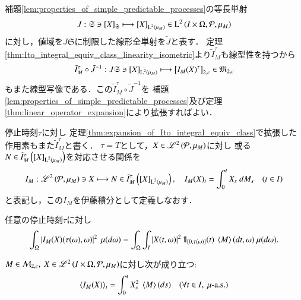 	\begin{prf}
		補題\ref{lem:properties_of_simple_predictable_processes}の等長単射
		\begin{align}
			J:\mathfrak{S} \ni \left[X\right]_{\mathfrak{S}} \longmapsto \left[X\right]_{\operatorname{L}^{2} \left(\mu_M\right)} \in \operatorname{L}^{2} \left(I \times \Omega,\mathcal{P},\mu_M\right)
		\end{align}
		に対し，値域を$J\mathfrak{S}$に制限した線形全単射を$\tilde{J}$と表す．
		定理\ref{thm:Ito_integral_equiv_class_linearity_isometric}より$\tilde{I}^\tau_M$も線型性を持つから
		\begin{align}
			\tilde{I}^\tau_M \circ \tilde{J}^{-1}: J \mathfrak{S} \ni \left[X\right]_{\operatorname{L}^{2} \left(\mu_M\right)} \longmapsto \left[I_M(X)^\tau\right]_{2,c} \in \mathfrak{M}_{2,c}
		\end{align}
		もまた線型写像である．この$\tilde{I}^\tau_M \circ \tilde{J}^{-1}$を
		補題\ref{lem:properties_of_simple_predictable_processes}及び定理\ref{thm:linear_operator_expansion}により拡張すればよい．
		\QED
	\end{prf}
	
	\begin{screen}
		\begin{dfn}[伊藤積分の拡張]
			停止時刻$\tau$に対し
			定理\ref{thm:expansion_of_Ito_integral_equiv_class}で拡張した作用素もまた$\tilde{I}^\tau_M$と書く．
			$\tau = T$として，$X \in \mathscr{L}^{2} \left(\mathcal{P},\mu_M\right)$に対し
			或る$N \in \tilde{I}^\tau_M\left( \left[X\right]_{\operatorname{L}^{2} \left(\mu_M\right)} \right)$を対応させる関係を
			\begin{align}
				I_M: \mathscr{L}^{2} \left(\mathcal{P},\mu_M\right) \ni X \longmapsto N \in \tilde{I}^\tau_M\left( \left[X\right]_{\operatorname{L}^{2} \left(\mu_M\right)} \right), \quad
				I_M(X)_t = \int_0^t X_s\ d M_s \quad (t \in I)
			\end{align}
			と表記し，この$I_M$を伊藤積分として定義しなおす．
		\end{dfn}
	\end{screen}
	
	\begin{screen}
		\begin{lem}[停止時刻で停めた伊藤積分]
			任意の停止時刻$\tau$に対し
			\begin{align}
				\int_\Omega \left| I_M(X)(\tau(\omega),\omega) \right|^2\ \mu(d\omega)
				= \int_\Omega \int_I \left| X(t,\omega) \right|^2 \defunc_{[0,\tau(\omega)]}(t)\ \inprod<M>(dt,\omega)\ \mu(d\omega).
			\end{align}
		\end{lem}
	\end{screen}
	
	\begin{screen}
		\begin{prp}[伊藤積分の二次変分]
			$M \in \mathcal{M}_{2,c},\ X \in \mathscr{L}^{2} \left(I \times \Omega,\mathcal{P},\mu_M\right)$に対し次が成り立つ:
			\begin{align}
				\inprod<I_M(X)>_t = \int_0^t X_s^2\ \inprod<M>(ds)
				\quad (\forall t \in I,\ \mbox{$\mu$-a.s.})
			\end{align}
		\end{prp}
	\end{screen}